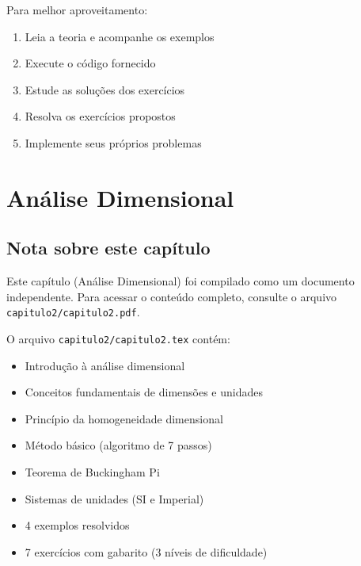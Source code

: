 \documentclass[12pt,a4paper,oneside]{book}
\begin{document}
Para melhor aproveitamento:
\begin{enumerate}
    \item Leia a teoria e acompanhe os exemplos
    \item Execute o código fornecido
    \item Estude as soluções dos exercícios
    \item Resolva os exercícios propostos
    \item Implemente seus próprios problemas
\end{enumerate}

\tableofcontents

\mainmatter

%

\chapter{Análise Dimensional}

\section*{Nota sobre este capítulo}

Este capítulo (Análise Dimensional) foi compilado como um documento independente.
Para acessar o conteúdo completo, consulte o arquivo \texttt{capitulo2/capitulo2.pdf}.

O arquivo \texttt{capitulo2/capitulo2.tex} contém:

\begin{itemize}
    \item Introdução à análise dimensional
    \item Conceitos fundamentais de dimensões e unidades
    \item Princípio da homogeneidade dimensional
    \item Método básico (algoritmo de 7 passos)
    \item Teorema de Buckingham Pi
    \item Sistemas de unidades (SI e Imperial)
    \item 4 exemplos resolvidos
    \item 7 exercícios com gabarito (3 níveis de dificuldade)
\end{itemize}
\end{document}
